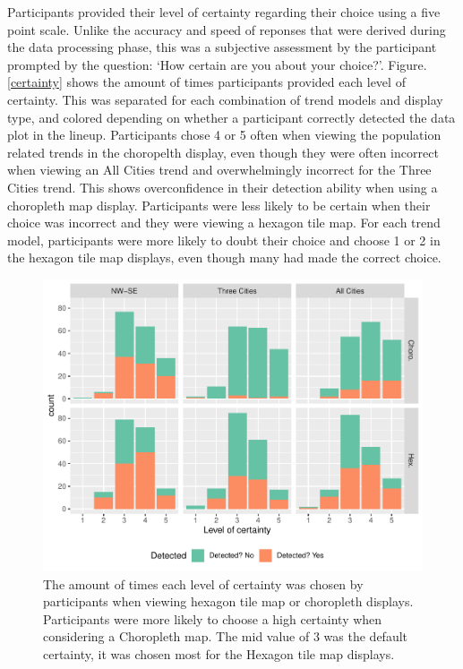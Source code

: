 \documentclass[conference,final,]{IEEEtran}
\makeatletter
\def\maxwidth{\ifdim\Gin@nat@width>\linewidth\linewidth
\else\Gin@nat@width\fi}
\let\Oldincludegraphics\includegraphics
\renewcommand{\includegraphics}[1]{\Oldincludegraphics[width=\maxwidth]{#1}}
\makeatother
\begin{document}
Participants provided their level of certainty regarding their choice using a five point scale.
Unlike the accuracy and speed of reponses that were derived during the data processing phase, this was a subjective
assessment by the participant prompted by the question: `How certain are you about your choice?'.
Figure. \ref{certainty} shows the amount of times participants provided each level of certainty. This was separated for each combination of trend models and display type, and colored depending on whether a participant correctly detected the data plot in the lineup.
Participants chose 4 or 5 often when viewing the population related trends in the choropelth display, even though they were often incorrect when viewing an All Cities trend and overwhelmingly incorrect for the Three Cities trend. This shows overconfidence in their detection ability when using a choropleth map display. Participants were less likely to be certain when their choice was incorrect and they were viewing a hexagon tile map.
For each trend model, participants were more likely to doubt their choice and choose 1 or 2 in the hexagon tile map displays, even though many had made the correct choice.

\begin{figure}
\centering
\includegraphics{paper_files/figure-latex/certainty-1.pdf}
\caption{\label{fig:certainty}The amount of times each level of certainty was chosen by participants when viewing hexagon tile map or choropleth displays. Participants were more likely to choose a high certainty when considering a Choropleth map. The mid value of 3 was the default certainty, it was chosen most for the Hexagon tile map displays.}
\end{figure}
\end{document}

